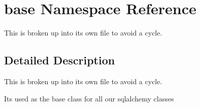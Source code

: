 \hypertarget{namespacebase}{}\section{base Namespace Reference}
\label{namespacebase}


This is broken up into it\textquotesingle{}s own file to avoid a cycle.  




\subsection{Detailed Description}
This is broken up into it\textquotesingle{}s own file to avoid a cycle. 

It\textquotesingle{}s used as the base class for all our sqlalchemy classes 